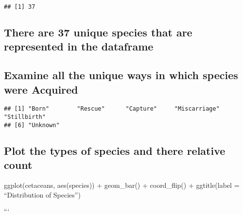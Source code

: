 \documentclass[
]{article}
\newenvironment{Shaded}{\begin{snugshade}}{\end{snugshade}}
\newcommand{\FunctionTok}[1]{\textcolor[rgb]{0.00,0.00,0.00}{#1}}
\newcommand{\NormalTok}[1]{#1}
\newcommand{\SpecialCharTok}[1]{\textcolor[rgb]{0.00,0.00,0.00}{#1}}
\begin{document}
\begin{verbatim}
## [1] 37
\end{verbatim}

\hypertarget{there-are-37-unique-species-that-are-represented-in-the-dataframe}{%
\subsection{There are 37 unique species that are represented in the
dataframe}\label{there-are-37-unique-species-that-are-represented-in-the-dataframe}}

\hypertarget{examine-all-the-unique-ways-in-which-species-were-acquired}{%
\subsection{Examine all the unique ways in which species were
Acquired}\label{examine-all-the-unique-ways-in-which-species-were-acquired}}

\begin{Shaded}
\end{Shaded}

\begin{verbatim}
## [1] "Born"        "Rescue"      "Capture"     "Miscarriage" "Stillbirth" 
## [6] "Unknown"
\end{verbatim}

\hypertarget{plot-the-types-of-species-and-there-relative-count}{%
\subsection{Plot the types of species and there relative
count}\label{plot-the-types-of-species-and-there-relative-count}}

ggplot(cetaceans, aes(species)) + geom\_bar() + coord\_flip() +
ggtitle(label = ``Distribution of Species'')

```
\end{document}
